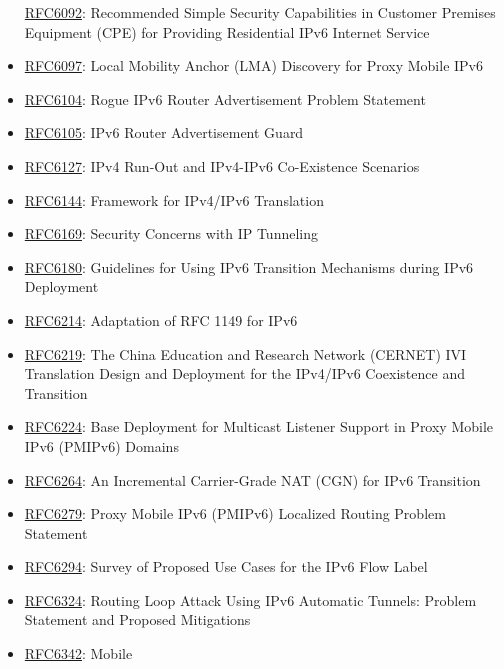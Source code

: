 \documentclass[
]{article}
\begin{document}
\begin{itemize}
  \href{https://www.rfc-editor.org/info/rfc6092}{RFC6092}: Recommended
  Simple Security Capabilities in Customer Premises Equipment (CPE) for
  Providing Residential IPv6 Internet Service
\item
  \href{https://www.rfc-editor.org/info/rfc6097}{RFC6097}: Local
  Mobility Anchor (LMA) Discovery for Proxy Mobile IPv6
\item
  \href{https://www.rfc-editor.org/info/rfc6104}{RFC6104}: Rogue IPv6
  Router Advertisement Problem Statement
\item
  \href{https://www.rfc-editor.org/info/rfc6105}{RFC6105}: IPv6 Router
  Advertisement Guard
\item
  \href{https://www.rfc-editor.org/info/rfc6127}{RFC6127}: IPv4 Run-Out
  and IPv4-IPv6 Co-Existence Scenarios
\item
  \href{https://www.rfc-editor.org/info/rfc6144}{RFC6144}: Framework for
  IPv4/IPv6 Translation
\item
  \href{https://www.rfc-editor.org/info/rfc6169}{RFC6169}: Security
  Concerns with IP Tunneling
\item
  \href{https://www.rfc-editor.org/info/rfc6180}{RFC6180}: Guidelines
  for Using IPv6 Transition Mechanisms during IPv6 Deployment
\item
  \href{https://www.rfc-editor.org/info/rfc6214}{RFC6214}: Adaptation of
  RFC 1149 for IPv6
\item
  \href{https://www.rfc-editor.org/info/rfc6219}{RFC6219}: The China
  Education and Research Network (CERNET) IVI Translation Design and
  Deployment for the IPv4/IPv6 Coexistence and Transition
\item
  \href{https://www.rfc-editor.org/info/rfc6224}{RFC6224}: Base
  Deployment for Multicast Listener Support in Proxy Mobile IPv6
  (PMIPv6) Domains
\item
  \href{https://www.rfc-editor.org/info/rfc6264}{RFC6264}: An
  Incremental Carrier-Grade NAT (CGN) for IPv6 Transition
\item
  \href{https://www.rfc-editor.org/info/rfc6279}{RFC6279}: Proxy Mobile
  IPv6 (PMIPv6) Localized Routing Problem Statement
\item
  \href{https://www.rfc-editor.org/info/rfc6294}{RFC6294}: Survey of
  Proposed Use Cases for the IPv6 Flow Label
\item
  \href{https://www.rfc-editor.org/info/rfc6324}{RFC6324}: Routing Loop
  Attack Using IPv6 Automatic Tunnels: Problem Statement and Proposed
  Mitigations
\item
  \href{https://www.rfc-editor.org/info/rfc6342}{RFC6342}: Mobile

\end{itemize}
\end{document}
